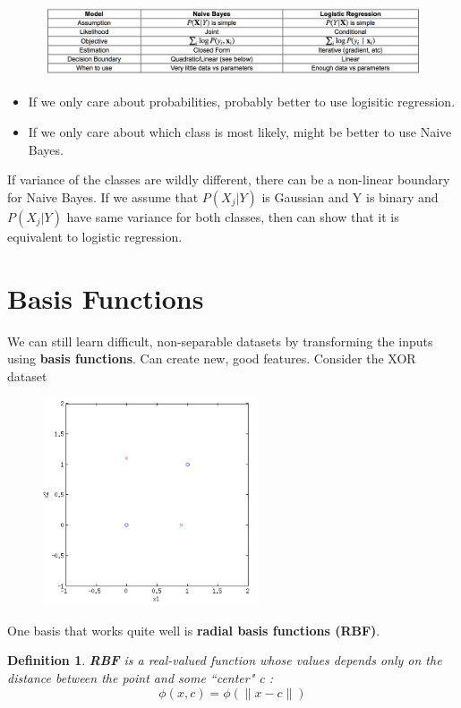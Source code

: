 \documentclass[a4paper]{article}\usepackage[]{graphicx}\usepackage[]{color}
\newtheorem{defn}{Definition}[section]
\begin{document}
\begin{figure}[H]
\centering
\includegraphics[width=5in]{NBvsLogit.png}
\end{figure}

\begin{itemize}
\item If we only care about probabilities, probably better to use logisitic regression.  
\item If we only care about which class is most likely, might be better to use Naive Bayes. 
\end{itemize}

If variance of the classes are wildly different, there can be a non-linear boundary for Naive Bayes. If we assume that $P(X_j|Y)$ is Gaussian and Y is binary and $P(X_j|Y)$ have same variance for both classes, then can show that it is equivalent to logistic regression. 

\section{Basis Functions}
We can still learn difficult, non-separable datasets by transforming the inputs using \textbf{basis functions}. Can create new, good features. Consider the XOR dataset

\begin{figure}[H]
\centering
\includegraphics[width=2.5in]{xor_data.png}
\end{figure}

One basis that works quite well is \textbf{radial basis functions (RBF)}. 
\begin{defn}
\textbf{RBF} is a real-valued function whose values depends only on the distance between the point and some ``center" c : 
\begin{equation*} \phi(x,c) = \phi(\lVert x-c \rVert) \end{equation*}
\end{defn}
\end{document}
